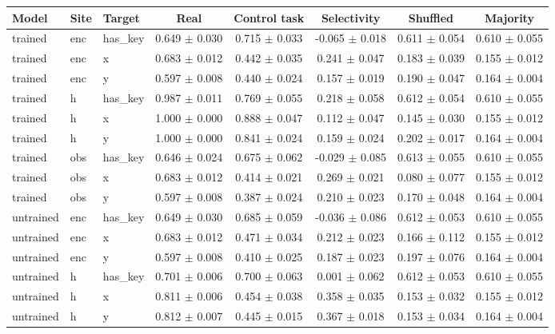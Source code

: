 \begin{tabular}{lllccccc}
\toprule
Model & Site & Target & Real & Control task & Selectivity & Shuffled & Majority \\
\midrule
trained & enc & has\_key & 0.649 $\pm$ 0.030 & 0.715 $\pm$ 0.033 & -0.065 $\pm$ 0.018 & 0.611 $\pm$ 0.054 & 0.610 $\pm$ 0.055 \\
trained & enc & x & 0.683 $\pm$ 0.012 & 0.442 $\pm$ 0.035 & 0.241 $\pm$ 0.047 & 0.183 $\pm$ 0.039 & 0.155 $\pm$ 0.012 \\
trained & enc & y & 0.597 $\pm$ 0.008 & 0.440 $\pm$ 0.024 & 0.157 $\pm$ 0.019 & 0.190 $\pm$ 0.047 & 0.164 $\pm$ 0.004 \\
trained & h & has\_key & 0.987 $\pm$ 0.011 & 0.769 $\pm$ 0.055 & 0.218 $\pm$ 0.058 & 0.612 $\pm$ 0.054 & 0.610 $\pm$ 0.055 \\
trained & h & x & 1.000 $\pm$ 0.000 & 0.888 $\pm$ 0.047 & 0.112 $\pm$ 0.047 & 0.145 $\pm$ 0.030 & 0.155 $\pm$ 0.012 \\
trained & h & y & 1.000 $\pm$ 0.000 & 0.841 $\pm$ 0.024 & 0.159 $\pm$ 0.024 & 0.202 $\pm$ 0.017 & 0.164 $\pm$ 0.004 \\
trained & obs & has\_key & 0.646 $\pm$ 0.024 & 0.675 $\pm$ 0.062 & -0.029 $\pm$ 0.085 & 0.613 $\pm$ 0.055 & 0.610 $\pm$ 0.055 \\
trained & obs & x & 0.683 $\pm$ 0.012 & 0.414 $\pm$ 0.021 & 0.269 $\pm$ 0.021 & 0.080 $\pm$ 0.077 & 0.155 $\pm$ 0.012 \\
trained & obs & y & 0.597 $\pm$ 0.008 & 0.387 $\pm$ 0.024 & 0.210 $\pm$ 0.023 & 0.170 $\pm$ 0.048 & 0.164 $\pm$ 0.004 \\
untrained & enc & has\_key & 0.649 $\pm$ 0.030 & 0.685 $\pm$ 0.059 & -0.036 $\pm$ 0.086 & 0.612 $\pm$ 0.053 & 0.610 $\pm$ 0.055 \\
untrained & enc & x & 0.683 $\pm$ 0.012 & 0.471 $\pm$ 0.034 & 0.212 $\pm$ 0.023 & 0.166 $\pm$ 0.112 & 0.155 $\pm$ 0.012 \\
untrained & enc & y & 0.597 $\pm$ 0.008 & 0.410 $\pm$ 0.025 & 0.187 $\pm$ 0.023 & 0.197 $\pm$ 0.076 & 0.164 $\pm$ 0.004 \\
untrained & h & has\_key & 0.701 $\pm$ 0.006 & 0.700 $\pm$ 0.063 & 0.001 $\pm$ 0.062 & 0.612 $\pm$ 0.053 & 0.610 $\pm$ 0.055 \\
untrained & h & x & 0.811 $\pm$ 0.006 & 0.454 $\pm$ 0.038 & 0.358 $\pm$ 0.035 & 0.153 $\pm$ 0.032 & 0.155 $\pm$ 0.012 \\
untrained & h & y & 0.812 $\pm$ 0.007 & 0.445 $\pm$ 0.015 & 0.367 $\pm$ 0.018 & 0.153 $\pm$ 0.034 & 0.164 $\pm$ 0.004 \\
\bottomrule
\end{tabular}
